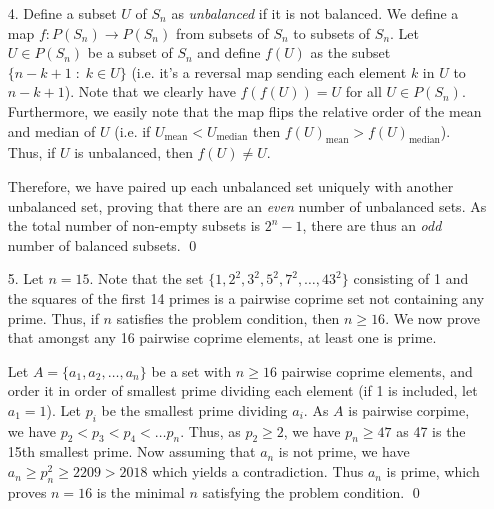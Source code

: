 \documentclass[a4paper, 12pt]{article}
\begin{document}
\begin{enumerate}
    
    \newpage
    \item[4.]  Define a subset $U$ of $S_n$ as \textit{unbalanced} if it is not balanced. We define a map $f : P(S_n) \to P(S_n)$ from subsets of $S_n$ to subsets of $S_n$. Let $U \in P(S_n)$ be a subset of $S_n$ and define $f(U)$ as the subset  $\{ n -k+1 \;:\; k \in U  \}$ (i.e. it's a reversal map sending each element $k$ in $U$ to $n-k+1$). Note that we clearly have $f(f(U)) = U$ for all $U \in P(S_n)$. Furthermore, we easily note that the map flips the relative order of the mean and median of $U$ (i.e. if $U_\textrm{mean} < U_\textrm{median}$ then $f(U)_\textrm{mean} > f(U)_\textrm{median}$). Thus, if $U$ is unbalanced, then $f(U) \not = U$.

    Therefore, we have paired up each unbalanced set uniquely with another unbalanced set, proving that there are an \textit{even} number of unbalanced sets. As the total number of non-empty subsets is $2^n-1$, there are thus an \textit{odd} number of balanced subsets. \qed \\
    \vspace{5mm}
    
    \item[5.]  Let $n = 15$. Note that the set $\{1, 2^2, 3^2, 5^2, 7^2, \dots, 43^2 \}$ consisting of 1 and the squares of the first 14 primes is a pairwise coprime set not containing any prime. Thus, if $n$ satisfies the problem condition, then $n \geq 16$.  We now prove that amongst any 16 pairwise coprime elements, at least one is prime. 

    Let $A = \{a_1, a_2, \dots, a_n\}$ be a set with $n \geq 16$ pairwise coprime elements, and order it in order of smallest prime dividing each element (if 1 is included, let $a_1 = 1$). Let $p_i$ be the smallest prime dividing $a_i$. As $A$ is pairwise corpime, we have $p_2 < p_3 < p_4 < \dots p_n$. Thus, as $p_2 \geq 2$, we have $p_n \geq 47$ as 47 is the 15th smallest prime. Now assuming that $a_n$ is not prime, we have $a_n \geq p_n^2 \geq 2209 > 2018$ which yields a contradiction. Thus $a_n$ is prime, which proves $n = 16$ is the minimal $n$ satisfying the problem condition. \qed

    

\end{enumerate}
\end{document}
